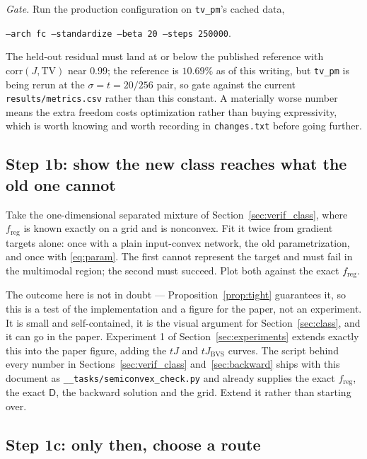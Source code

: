 \documentclass[11pt]{article}
\theoremstyle{definition}
\newcommand{\D}{\mathsf{D}}
\newcommand{\freg}{f_{\mathrm{reg}}}
\newcommand{\code}[1]{\texttt{#1}}
\newcommand{\Jbvs}{J_{\mathrm{BVS}}}
\begin{document}
\emph{Gate.} Run the production configuration on \code{tv\_pm}'s cached data,
\begin{center}
\code{--arch fc --standardize --beta 20 --steps 250000}.
\end{center}
The held-out residual must land at or below the published reference with $\mathrm{corr}(J,\mathrm{TV})$ near $0.99$; the reference is $10.69\%$ as of this writing, but \code{tv\_pm} is being rerun at the $\sigma = t = 20/256$ pair, so gate against the current \code{results/metrics.csv} rather than this constant. A materially worse number means the extra freedom costs optimization rather than buying expressivity, which is worth knowing and worth recording in \code{changes.txt} before going further.

\subsection{Step 1b: show the new class reaches what the old one cannot}

Take the one-dimensional separated mixture of Section~\ref{sec:verif_class}, where $\freg$ is known exactly on a grid and is nonconvex. Fit it twice from gradient targets alone: once with a plain input-convex network, the old parametrization, and once with \eqref{eq:param}. The first cannot represent the target and must fail in the multimodal region; the second must succeed. Plot both against the exact $\freg$.

The outcome here is not in doubt — Proposition~\ref{prop:tight} guarantees it, so this is a test of the implementation and a figure for the paper, not an experiment. It is small and self-contained, it is the visual argument for Section~\ref{sec:class}, and it can go in the paper. Experiment 1 of Section~\ref{sec:experiments} extends exactly this into the paper figure, adding the $tJ$ and $t\Jbvs$ curves. The script behind every number in Sections~\ref{sec:verif_class} and~\ref{sec:backward} ships with this document as \code{\_\_tasks/semiconvex\_check.py} and already supplies the exact $\freg$, the exact $\D$, the backward solution and the grid. Extend it rather than starting over.

\subsection{Step 1c: only then, choose a route}
\end{document}
